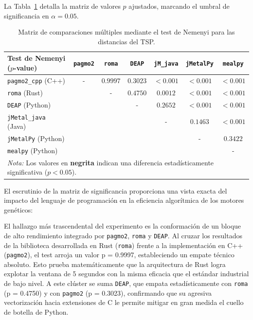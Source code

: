 \documentclass[12pt,a4paper,twoside,openright]{book}
\begin{document}
    La Tabla~\ref{tab:nemenyi_tsp} detalla la matriz de valores $p$ ajustados, marcando el umbral de significancia en $\alpha = 0.05$.

\begin{table}[htbp]
\centering
\small
\setlength{\tabcolsep}{4pt}
\begin{tabular}{l cccccc}
\toprule
\textbf{Test de Nemenyi ($p$-value)} & \texttt{pagmo2} & \texttt{roma} & \texttt{DEAP} & \texttt{jM\_java} & \texttt{jMetalPy} & \texttt{mealpy} \\
\midrule
\texttt{pagmo2\_cpp} (C++)    & - & $0.9997$ & $0.3023$ & $\mathbf{< 0.001}$ & $\mathbf{< 0.001}$ & $\mathbf{< 0.001}$ \\
\texttt{roma} (Rust)         & & - & $0.4750$ & $\mathbf{0.0012}$ & $\mathbf{< 0.001}$ & $\mathbf{< 0.001}$ \\
\texttt{DEAP} (Python)        & & & - & $0.2652$ & $\mathbf{< 0.001}$ & $\mathbf{< 0.001}$ \\
\texttt{jMetal\_java} (Java)  & & & & - & $0.1463$ & $\mathbf{< 0.001}$ \\
\texttt{jMetalPy} (Python)    & & & & & - & $0.3422$ \\
\texttt{mealpy} (Python)      & & & & & & - \\
\bottomrule
\multicolumn{7}{l}{\scriptsize \textit{Nota:} Los valores en \textbf{negrita} indican una diferencia estadísticamente significativa ($p < 0.05$).}
\end{tabular}
\caption{Matriz de comparaciones múltiples mediante el test de Nemenyi para las distancias del TSP.}
\label{tab:nemenyi_tsp}
\end{table}

    El escrutinio de la matriz de significancia proporciona una vista exacta del impacto del lenguaje de programación en la eficiencia algorítmica de los motores genéticos:

    El hallazgo más trascendental del experimento es la conformación de un bloque de alto rendimiento integrado por \texttt{pagmo2}, \texttt{roma} y \texttt{DEAP}. Al cruzar los resultados de la biblioteca desarrollada en Rust (\texttt{roma}) frente a la implementación en C++ (\texttt{pagmo2}), el test arroja un valor p = 0.9997, estableciendo un empate técnico absoluto. Esto prueba matemáticamente que la arquitectura de Rust logra explotar la ventana de 5 segundos con la misma eficacia que el estándar industrial de bajo nivel. A este clúster se suma \texttt{DEAP}, que empata estadísticamente con \texttt{roma} (p = 0.4750) y con \texttt{pagmo2} (p = 0.3023), confirmando que su agresiva vectorización hacia extensiones de C le permite mitigar en gran medida el cuello de botella de Python.
\end{document}
